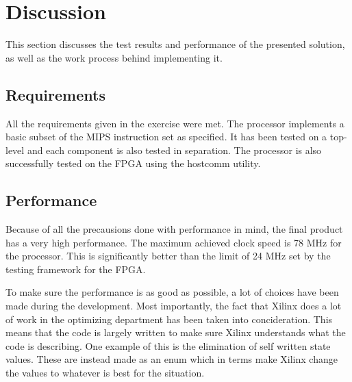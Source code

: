 \section{Discussion}




This section discusses the test results and performance of the presented solution,
as well as the work process behind implementing it.

\subsection{Requirements}
All the requirements given in the exercise were met.
The processor implements a basic subset of the MIPS instruction set \cite[p.64]{compendium} as specified.
It has been tested on a top-level and each component is also tested in separation.
The processor is also successfully tested on the FPGA using the hostcomm \cite{hostcomm} utility.

\subsection{Performance}
Because of all the precausions done with performance in mind, the final product has a very high performance.
The maximum achieved clock speed is 78 MHz for the processor.
This is significantly better than the limit of 24 MHz set by the testing framework for the FPGA.

To make sure the performance is as good as possible, a lot of choices have been made during the development.
Most importantly, the fact that Xilinx does a lot of work in the optimizing department has been taken into concideration.
This means that the code is largely written to make sure Xilinx understands what the code is describing.
One example of this is the elimination of self written state values.
These are instead made as an enum which in terms make Xilinx change the values to whatever is best for the situation.

